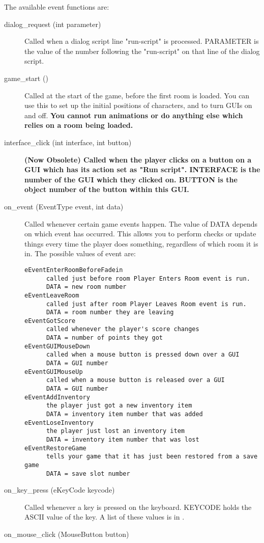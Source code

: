 The available event functions are:
\begin{description}
\item [dialog_request (int parameter)]
  Called when a dialog script line "run-script" is processed. PARAMETER is
  the value of the number following the "run-script" on that line of the
  dialog script.
\item [game_start ()]
  Called at the start of the game, before the first room is loaded. You can
  use this to set up the initial positions of characters, and to turn
  GUIs on and off. \bf{You cannot run animations or do anything else
  which relies on a room being loaded}.
\item [interface_click (int interface, int button)]
  \bf{(Now Obsolete)} Called when the player clicks on a button on a GUI which has its
  action set as "Run script". INTERFACE is the number of the GUI which they
  clicked on. BUTTON is the object number of the button within this GUI.
\item [on_event (EventType event, int data)]
  Called whenever certain game events happen. The value of DATA depends on
  which event has occurred. This allows you to perform checks or update things
  every time the player does something, regardless of which room it is in.
  The possible values of event are:\begin{verbatim}
eEventEnterRoomBeforeFadein
      called just before room Player Enters Room event is run.
      DATA = new room number
eEventLeaveRoom
      called just after room Player Leaves Room event is run.
      DATA = room number they are leaving
eEventGotScore
      called whenever the player's score changes
      DATA = number of points they got
eEventGUIMouseDown
      called when a mouse button is pressed down over a GUI
      DATA = GUI number
eEventGUIMouseUp
      called when a mouse button is released over a GUI
      DATA = GUI number
eEventAddInventory
      the player just got a new inventory item
      DATA = inventory item number that was added
eEventLoseInventory
      the player just lost an inventory item
      DATA = inventory item number that was lost
eEventRestoreGame
      tells your game that it has just been restored from a save game
      DATA = save slot number\end{verbatim}
\item [on_key_press (eKeyCode keycode)]
  Called whenever a key is pressed on the keyboard. KEYCODE holds the ASCII
  value of the key. A list of these values is in .
\item [on_mouse_click (MouseButton button)]

\end{description}
